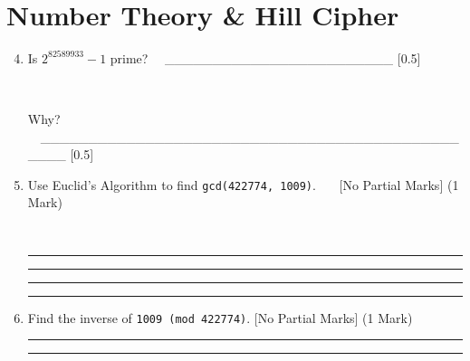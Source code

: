 \documentclass[12pt,emtex]{article}
\begin{document}
\newpage

\

\vspace{-20mm}

    
    \section{Number Theory \& Hill Cipher}
    
    \vspace{2mm}
    \begin{enumerate}
    
        \setcounter{enumi}{3}
        
\item Is $2^{82589933}-1$ prime?   \ \ \_\_\_\_\_\_\_\_\_\_\_\_\_\_\_\_\_\_\_\_\_\_\_\_	\hfill [0.5]

\

Why? \ \ \_\_\_\_\_\_\_\_\_\_\_\_\_\_\_\_\_\_\_\_\_\_\_\_\_\_\_\_\_\_\_\_\_\_\_\_\_\_\_\_\_\_\_\_\_\_\_\_ \hfill [0.5]

\item Use Euclid's Algorithm to find \texttt{gcd(422774, 1009)}.
\ \ \ 
       [No Partial Marks] \hfill  (1 Mark)


\

  \vspace{10mm}

    \hrule

    \vspace{10mm}

    \hrule

    \vspace{10mm}

    \hrule

    \vspace{10mm}

    \hrule

    \vspace{10mm}

  


    \item Find the inverse of \texttt{1009 (mod 422774)}. [No Partial Marks] \hfill     (1 Mark)



  
    \vspace{10mm}

    \hrule

    \vspace{10mm}

    \hrule

    \vspace{10mm}


\end{enumerate}
\end{document}

